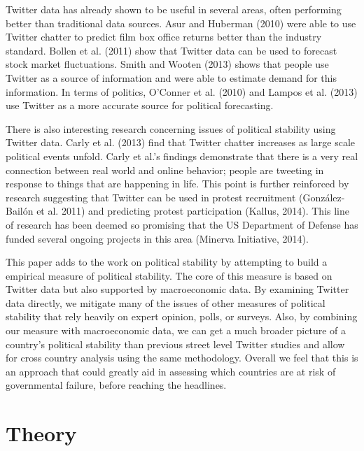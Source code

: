 \documentclass[12pt]{article}
\begin{document}
\begin{spacing}{1.5}
Twitter data has already shown to be useful in several areas, often performing better than traditional data sources. Asur and Huberman (2010) were able to use Twitter chatter to predict film box office returns better than the industry standard. Bollen et al. (2011) show that Twitter data can be used to forecast stock market fluctuations. Smith and Wooten (2013) shows that people use Twitter as a source of information and were able to estimate demand for this information. In terms of politics, O'Conner et al. (2010) and Lampos et al. (2013) use Twitter as a more accurate source for political forecasting. 

There is also interesting research concerning issues of political stability using Twitter data. Carly et al. (2013) find that Twitter chatter increases as large scale political events unfold. Carly et al.'s findings demonstrate that there is a very real connection between real world and online behavior; people are tweeting in response to things that are happening in life. This point is further reinforced by research suggesting that Twitter can be used in protest recruitment (Gonz{\'a}lez-Bail{\'o}n et al. 2011) and predicting protest participation (Kallus, 2014). This line of research has been deemed so promising that the US Department of Defense has funded several ongoing projects in this area (Minerva Initiative, 2014).  

This paper adds to the work on political stability by attempting to build a empirical measure of political stability. The core of this measure is based on Twitter data but also supported by macroeconomic data. By examining Twitter data directly, we mitigate many of the issues of other measures of political stability that rely heavily on expert opinion, polls, or surveys. Also, by combining our measure with macroeconomic data, we can get a much broader picture of a country's political stability than previous street level Twitter studies and allow for cross country analysis using the same methodology. Overall we feel that this is an approach that could greatly aid in assessing which countries are at risk of governmental failure, before reaching the headlines.      

\section*{Theory}



\end{spacing}
\end{document}
